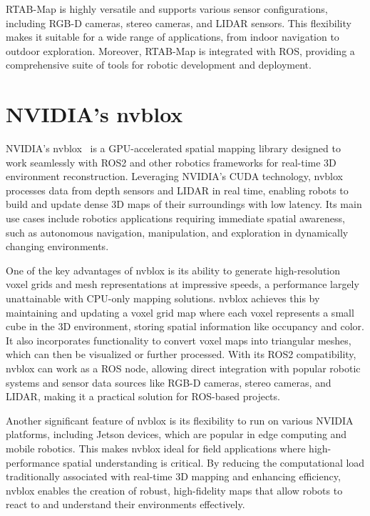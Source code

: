 RTAB-Map is highly versatile and supports various sensor configurations, including RGB-D cameras, stereo cameras, and LIDAR sensors. This flexibility makes it suitable for a wide range of applications, from indoor navigation to outdoor exploration. Moreover, RTAB-Map is integrated with ROS, providing a comprehensive suite of tools for robotic development and deployment.

\section{NVIDIA's nvblox}

NVIDIA’s nvblox~\cite{nvblox_docs} is a GPU-accelerated spatial mapping library designed to work seamlessly with ROS2 and other robotics frameworks for real-time 3D environment reconstruction. Leveraging NVIDIA’s CUDA technology, nvblox processes data from depth sensors and LIDAR in real time, enabling robots to build and update dense 3D maps of their surroundings with low latency. Its main use cases include robotics applications requiring immediate spatial awareness, such as autonomous navigation, manipulation, and exploration in dynamically changing environments.

One of the key advantages of nvblox is its ability to generate high-resolution voxel grids and mesh representations at impressive speeds, a performance largely unattainable with CPU-only mapping solutions. nvblox achieves this by maintaining and updating a voxel grid map where each voxel represents a small cube in the 3D environment, storing spatial information like occupancy and color. It also incorporates functionality to convert voxel maps into triangular meshes, which can then be visualized or further processed. With its ROS2 compatibility, nvblox can work as a ROS node, allowing direct integration with popular robotic systems and sensor data sources like RGB-D cameras, stereo cameras, and LIDAR, making it a practical solution for ROS-based projects.

Another significant feature of nvblox is its flexibility to run on various NVIDIA platforms, including Jetson devices, which are popular in edge computing and mobile robotics. This makes nvblox ideal for field applications where high-performance spatial understanding is critical. By reducing the computational load traditionally associated with real-time 3D mapping and enhancing efficiency, nvblox enables the creation of robust, high-fidelity maps that allow robots to react to and understand their environments effectively.
